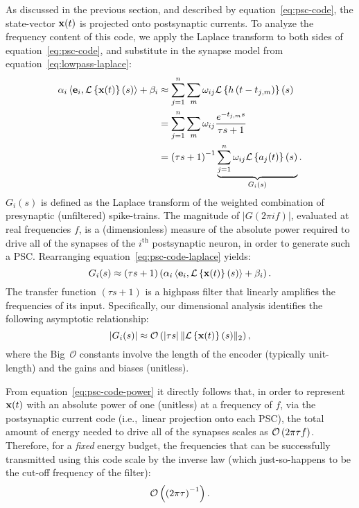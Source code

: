 As discussed in the previous section, and described by equation~\ref{eq:psc-code}, the state-vector $\mathbf{x}(t)$ is projected onto postsynaptic currents.
To analyze the frequency content of this code, we apply the Laplace transform to both sides of equation~\ref{eq:psc-code}, and substitute in the synapse model from equation~\ref{eq:lowpass-laplace}:
\begin{equation} \label{eq:psc-code-laplace}
\begin{aligned}
\alpha_i \left\langle \mathbf{e}_i\text{,}\, \mathcal{L}\left\{{ \mathbf{x}(t) }\right\}(s) \right\rangle + \beta_i &\approx \sum_{j=1}^n \sum_m \omega_{ij} \mathcal{L}\left\{{ h \left( t - t_{j\text{,}m} \right) }\right\}(s) \\
&= \sum_{j=1}^n \sum_m \omega_{ij} \frac{e^{-{t_{j\text{,}m}s}}}{\tau s + 1} \\ 
&= \left( \tau s + 1 \right)^{-1} \underbrace{ \sum_{j=1}^n \omega_{ij} \mathcal{L}\left\{{ a_j(t) }\right\}(s) }_{G_i(s)} \text{.}
\end{aligned}
\end{equation}
$G_i(s)$ is defined as the Laplace transform of the weighted combination of presynaptic (unfiltered) spike-trains.
The magnitude of $| G(2\pi i f) |$, evaluated at real frequencies $f$, is a (dimensionless) measure of the absolute power required to drive all of the synapses of the $i^\text{th}$ postsynaptic neuron, in order to generate such a PSC.
Rearranging equation~\ref{eq:psc-code-laplace} yields:
\begin{equation} \label{eq:psc-code-rearranged}
G_i(s) \approx \left( \tau s + 1 \right) \left( \alpha_i \left\langle \mathbf{e}_i\text{,}\, \mathcal{L}\left\{{ \mathbf{x}(t) }\right\}(s) \right\rangle + \beta_i \right) \text{.}
\end{equation}
The transfer function $\left( \tau s + 1 \right)$ is a highpass filter that linearly amplifies the frequencies of its input.
Specifically, our dimensional analysis identifies the following asymptotic relationship:
\begin{equation} \label{eq:psc-code-power}
| G_i(s) | \approx \mathcal{O}\left({ \left| \tau s \right| \| \mathcal{L}\left\{{ \mathbf{x}(t) }\right\}(s) \|_2 }\right) \text{,}
\end{equation}
where the Big~$\mathcal{O}$ constants involve the length of the encoder (typically unit-length) and the gains and biases (unitless).

From equation~\ref{eq:psc-code-power} it directly follows that, in order to represent $\mathbf{x}(t)$ with an absolute power of one (unitless) at a frequency of $f$, via the postsynaptic current code (i.e.,~linear projection onto each PSC), the total amount of energy needed to drive all of the synapses scales as $\mathcal{O}\left({2 \pi \tau f }\right)$.
Therefore, for a \emph{fixed} energy budget, the frequencies that can be successfully transmitted using this code scale by the inverse law (which just-so-happens to be the cut-off frequency of the filter):
\begin{equation} \label{eq:low-frequency-representation}
\mathcal{O}\left({\left( 2 \pi \tau \right)^{-1}}\right) \text{.}
\end{equation}

